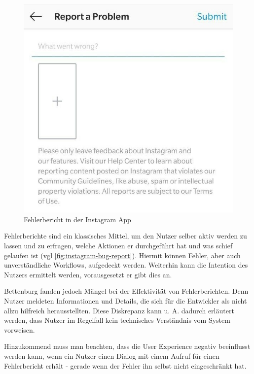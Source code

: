 \begin{figure}
\centering
\vspace{-\baselineskip}
\includegraphics[width=\linewidth]{img/instagram-feedback/instagram-feedback.jpg}
\caption{Fehlerbericht in der Instagram App \cite{Instagram}}
\label{fig:instagram-bug-report}
\end{figure}

Fehlerberichte sind ein klassisches Mittel, um den Nutzer selber aktiv werden zu lassen und zu erfragen, welche Aktionen er durchgeführt hat und was schief gelaufen ist (vgl \autoref{fig:instagram-bug-report}). Hiermit können Fehler, aber auch unverständliche Workflows, aufgedeckt werden. Weiterhin kann die Intention des Nutzers ermittelt werden, vorausgesetzt er gibt dies an.

Bettenburg \etal \cite{WhatMakesAGoodBugReport} fanden jedoch Mängel bei der Effektivität von Fehlerberichten. Denn Nutzer meldeten Informationen und Details, die sich für die Entwickler als nicht allzu hilfreich herausstellten. Diese Diskrepanz kann u. A. dadurch erläutert werden, dass Nutzer im Regelfall kein technisches Verständnis vom System vorweisen.

Hinzukommend muss man beachten, dass die User Experience negativ beeinflusst werden kann, wenn ein Nutzer einen Dialog mit einem Aufruf für einen Fehlerbericht erhält - gerade wenn der Fehler ihn selbst nicht eingeschränkt hat.

